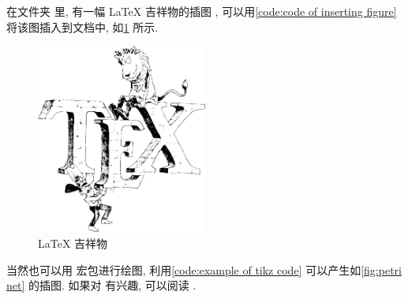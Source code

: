 \documentclass{./template/article}
\begin{document}
\begin{latexbox}[
  language = latex,
  caption = 插图图片代码示例,
  label = code:code of inserting figure
]
在文件夹  里, 有一幅 \LaTeX{} 吉祥物的插图 , 可以用\cref{code:code of inserting figure} 将该图插入到文档中, 如\cref{fig:mascots of latex} 所示.%
%
\begin{figure}[!htb]
  \centering
  \includegraphics[width = 0.5\textwidth]{./figures/mascots.pdf}
  \caption{\LaTeX{} 吉祥物}
  \label{fig:mascots of latex}
\end{figure}
\end{latexbox}

当然也可以用  宏包进行绘图, 利用\cref{code:example of tikz code} 可以产生如\cref{fig:petri net} 的插图. 如果对  有兴趣, 可以阅读 \cite{pgfmanual}.
\end{document}
